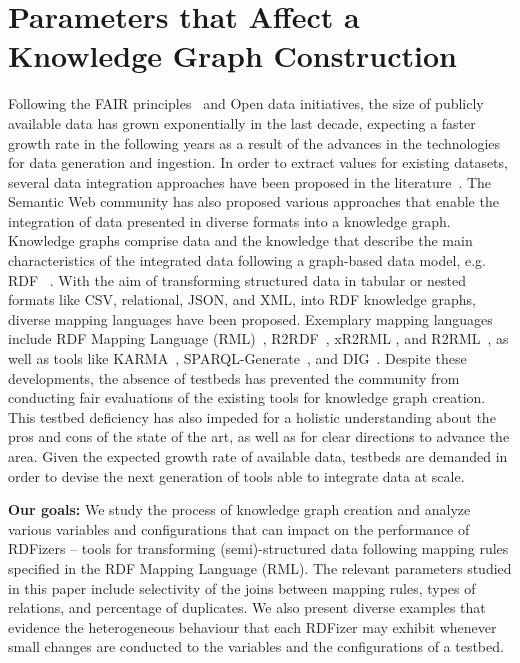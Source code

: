\section{Parameters that Affect a Knowledge Graph Construction}

Following the FAIR principles~\citep{wilkinson2016fair} and Open data initiatives, the size of publicly available data has grown exponentially in the last decade, expecting a faster growth rate in the following years as a result of the advances in the technologies for data generation and ingestion. In order to extract values for existing datasets, several data integration approaches have been proposed in the literature~\citep{Halevy18}. The Semantic Web community has also proposed various approaches that enable the integration  of data presented in diverse formats into a knowledge graph. Knowledge graphs comprise data and the knowledge that describe the main characteristics of the integrated data following a graph-based data model, e.g. RDF ~\citep{VidalEJSR19}. 
With the aim of transforming structured data in tabular or nested formats like CSV, relational, JSON, and XML, into RDF knowledge graphs, diverse mapping languages have been proposed. Exemplary mapping languages include RDF Mapping Language (RML)~\citep{dimou2014rml}, R2RDF~\citep{sequeda2014obda}, xR2RML \citep{michel2015translation}, and R2RML~\citep{R2RML}, as well as tools like KARMA~\citep{GuptaSKGTM12}, SPARQL-Generate~\citep{lefranccois2017sparql}, and DIG~\citep{knoblock2015exploiting}.  
Despite these developments, the absence of testbeds has prevented the community from conducting fair evaluations of the existing tools for knowledge graph creation. This testbed deficiency has also impeded for a holistic understanding about the pros and cons of the state of the art, as well as for clear directions to advance the area. Given the expected growth rate of available data, testbeds are demanded in order to devise the next generation of tools able to integrate data at scale.

\noindent \textbf{Our goals:} We study the process of knowledge graph creation and analyze various variables and configurations that can impact on the performance of RDFizers -- tools for transforming (semi)-structured data following mapping rules specified in the RDF Mapping Language (RML). The relevant parameters studied in this paper include selectivity of the joins between mapping rules, types of relations, and percentage of duplicates. We also present diverse examples that evidence the heterogeneous behaviour that each RDFizer may exhibit whenever small changes are conducted to the variables and the configurations of a testbed.  

